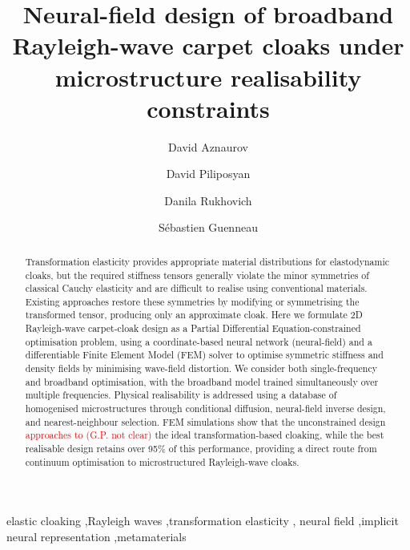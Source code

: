 \documentclass[preprint,12pt]{elsarticle}
\begin{document}
\begin{frontmatter}
\title{Neural-field design of broadband Rayleigh-wave carpet cloaks
under microstructure realisability constraints}

\author[1,2]{David Aznaurov}
\author[1]{David Piliposyan}
\author[1]{Danila Rukhovich}
\author[3]{Sébastien Guenneau}


\begin{abstract}

Transformation elasticity provides appropriate material distributions for elastodynamic cloaks, but the required stiffness tensors generally violate the minor symmetries of classical Cauchy elasticity and are difficult to realise using conventional materials.
Existing approaches restore these symmetries by modifying or symmetrising the transformed tensor, producing only an approximate cloak.
Here we formulate 2D Rayleigh-wave carpet-cloak design as a Partial Differential Equation-constrained optimisation problem, using a coordinate-based neural network (neural-field) and a differentiable Finite Element Model (FEM) solver to optimise symmetric stiffness and density fields by minimising wave-field distortion.
We consider both single-frequency and broadband optimisation, with the broadband model trained simultaneously over multiple frequencies.
Physical realisability is addressed using a database of homogenised microstructures through conditional diffusion, neural-field inverse design, and nearest-neighbour selection.
FEM simulations show that the unconstrained design \textcolor{red}{approaches to} \textcolor{red}{(G.P. not clear)} the ideal transformation-based cloaking,
while the best realisable design retains over 95\% of this performance, providing a direct route from continuum optimisation to microstructured Rayleigh-wave cloaks.

\end{abstract}

\begin{keyword}
elastic cloaking \sep Rayleigh waves \sep transformation elasticity \sep
neural field \sep implicit neural representation \sep metamaterials
\end{keyword}

\end{frontmatter}
\end{document}
